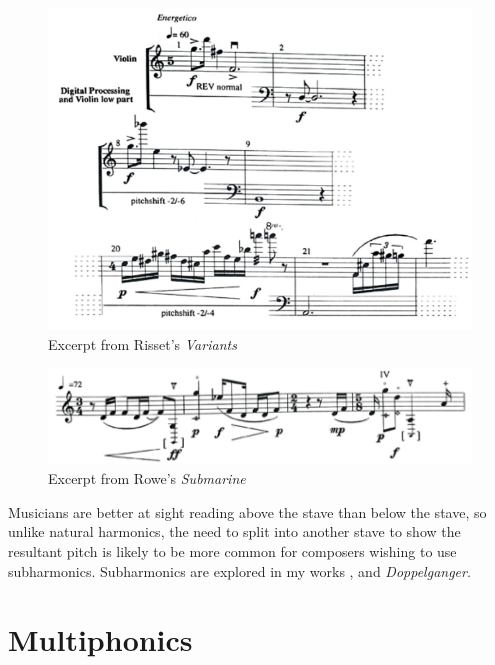 
\begin{figure}
  \includegraphics[width=\linewidth]{./resources/rissetALFExcerpt.pdf}
  \caption{Excerpt from Risset's \emph{Variants}}
\label{fig:Excerpt from Risset's Variants}
\end{figure}

\begin{figure}
  \includegraphics[width=\linewidth]{./resources/roweALFExcerpt.pdf}
  \caption{Excerpt from Rowe's \emph{Submarine}}
\label{fig:Excerpt from Rowe's Submarine}
\end{figure}


Musicians are better at sight reading above the stave than below the stave, so unlike natural harmonics, the need to split into another stave to show the resultant pitch is likely to be more common for composers wishing to use subharmonics. 
Subharmonics are explored in my works , and \emph{Doppelganger}.


\newpage
\section{Multiphonics}

